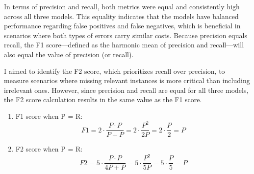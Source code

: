 \documentclass[11pt]{article}
\begin{document}
\begin{table}[h]
\centering
{}
\caption{Results from 3 models.}
\label{tab:results}
\end{table}

In terms of precision and recall, both metrics were equal and consistently high across all three models. This equality indicates that the models have balanced performance regarding false positives and false negatives, which is beneficial in scenarios where both types of errors carry similar costs. Because precision equals recall, the F1 score—defined as the harmonic mean of precision and recall—will also equal the value of precision (or recall).

I aimed to identify the F2 score, which prioritizes recall over precision, to measure scenarios where missing relevant instances is more critical than including irrelevant ones. However, since precision and recall are equal for all three models, the F2 score calculation results in the same value as the F1 score.

\begin{enumerate}
    \item F1 score when P = R:
    \begin{equation}
    F1 = 2 \cdot \frac{P \cdot P}{P + P} = 2 \cdot \frac{P^2}{2P} = 2 \cdot \frac{P}{2} = P
    \end{equation}

    \item F2 score when P = R:
    \begin{equation}
    F2 = 5 \cdot \frac{P \cdot P}{4P + P} = 5 \cdot \frac{P^2}{5P} = 5 \cdot \frac{P}{5} = P
    \end{equation}
\end{enumerate}
\end{document}
